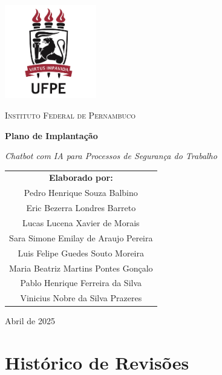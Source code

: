 \documentclass[12pt,a4paper]{article}
\begin{document}
\begin{titlepage}
    \thispagestyle{empty}
    \centering
    \vspace*{0.5cm}
    {\includegraphics[width=4cm]{UFPE.jpg}\par}
    \vspace{1cm}
    {\scshape\LARGE Instituto Federal de Pernambuco \par}
    \vspace{1.5cm}
    {\huge\bfseries Plano de Implantação \par}
    \vspace{1cm}
    {\Large\itshape Chatbot com IA para Processos de Segurança do Trabalho\par}
    \vfill
    \begin{center}
    \begin{tabular}{c}
        {\large \textbf{Elaborado por:}}\\[0.5cm]
        Pedro Henrique Souza Balbino\\
        Eric Bezerra Londres Barreto\\
        Lucas Lucena Xavier de Morais\\
        Sara Simone Emilay de Araujo Pereira\\
        Luis Felipe Guedes Souto Moreira\\
        Maria Beatriz Martins Pontes Gonçalo\\
        Pablo Henrique Ferreira da Silva\\
        Vinicius Nobre da Silva Prazeres
    \end{tabular}
    \end{center}
    \vfill
    {\large Abril de 2025\par}
\end{titlepage}

\newpage
\thispagestyle{empty}
\section*{Histórico de Revisões}
\end{document}
